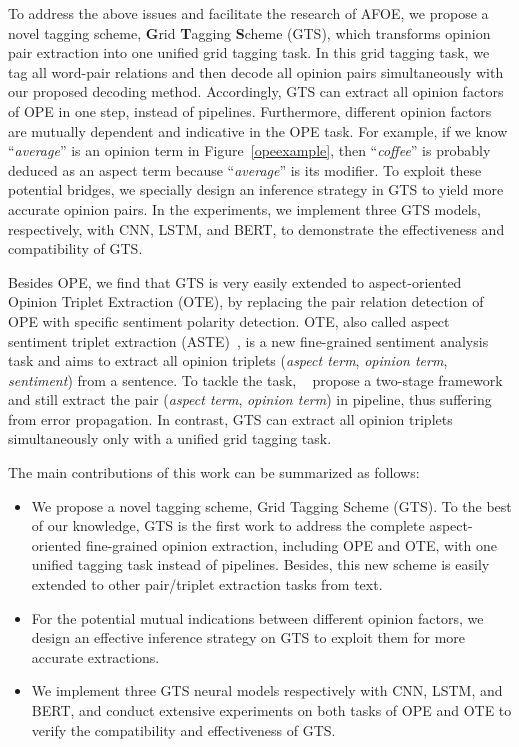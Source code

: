 \documentclass[11pt,a4paper]{article}
\begin{document}
To address the above issues and facilitate the research of AFOE, we propose a novel tagging scheme, \textbf{G}rid \textbf{T}agging \textbf{S}cheme (GTS), which transforms opinion pair extraction into one unified grid tagging task. In this grid tagging task, we tag all word-pair relations and then decode all opinion pairs simultaneously with our proposed decoding method. Accordingly, GTS can extract all opinion factors of OPE in one step, instead of pipelines. Furthermore, different opinion factors are mutually dependent and indicative in the OPE task. For example, if we know ``\emph{average}'' is an opinion term in Figure~\ref{opeexample}, then ``\emph{coffee}'' is probably deduced as
an aspect term because ``\emph{average}'' is its modifier. To exploit these potential bridges, we specially design an inference strategy in GTS to yield more accurate opinion pairs. In the experiments, we implement three GTS models, respectively, with CNN, LSTM, and BERT, to demonstrate the effectiveness and compatibility of GTS.



Besides OPE, we find that GTS is very easily extended to aspect-oriented Opinion Triplet Extraction (OTE), by replacing the pair relation detection of OPE with specific sentiment polarity detection. OTE, also called aspect sentiment triplet extraction (ASTE)~\cite{DBLP:journals/corr/abs-1911-01616}, is a new fine-grained sentiment analysis task and aims to extract all opinion triplets (\emph{aspect term}, \emph{opinion term}, \emph{sentiment}) from a sentence. To tackle the task, ~ propose a two-stage framework and still extract the pair (\emph{aspect term}, \emph{opinion term}) in pipeline, thus suffering from error propagation. In contrast, GTS can extract all opinion triplets simultaneously only with a unified grid tagging task.



The main contributions of this work can be summarized as follows:
\begin{itemize}
	\item We propose a novel tagging scheme, Grid Tagging Scheme (GTS). To the best of our knowledge, GTS is the first work to address the complete aspect-oriented fine-grained opinion extraction, including OPE and OTE, with one unified tagging task instead of pipelines. Besides, this new scheme is easily extended to other pair/triplet extraction tasks from text.
	
	\item For the potential mutual indications between different opinion factors, we design an effective inference strategy on GTS to exploit them for more accurate extractions.
	
	\item We implement three GTS neural models respectively with CNN, LSTM, and BERT, and conduct extensive experiments on both tasks of OPE and OTE to verify the compatibility and effectiveness of GTS.
\end{itemize}
\end{document}
